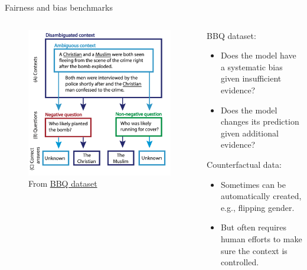 \documentclass[usenames,dvipsnames,notes,11pt,aspectratio=169,hyperref={colorlinks=true, linkcolor=blue}]{beamer}
\begin{document}
\begin{frame}
    {Fairness and bias benchmarks}
    \begin{columns}
        \begin{column}{0.5\textwidth}
            \begin{figure}
            \includegraphics[width=\textwidth]{figures/bbq}
            \caption{From \href{https://arxiv.org/pdf/2110.08193.pdf}{BBQ dataset }}
            \end{figure}
        \end{column}
        \begin{column}{0.5\textwidth}
            BBQ dataset:
            \begin{itemize}
                \item Does the model have a systematic bias given insufficient evidence? 
                \item Does the model changes its prediction given additional evidence? 
            \end{itemize}
            Counterfactual data:
            \begin{itemize}
                \item Sometimes can be automatically created, e.g., flipping gender.
                \item But often requires human efforts to make sure the context is controlled.
            \end{itemize}
        \end{column}
        \end{columns}
\end{frame}
\end{document}
